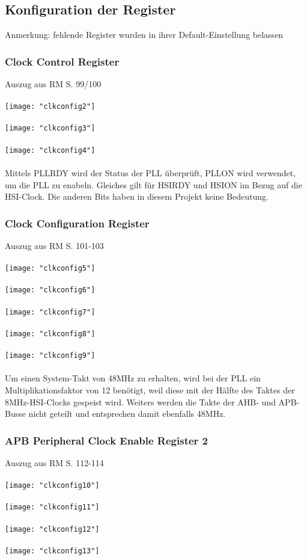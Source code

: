 \documentclass[11pt]{report}
\begin{document}
		\subsection{Konfiguration der Register}
			Anmerkung: fehlende Register wurden in ihrer Default-Einstellung belassen
			\subsubsection{Clock Control Register}
				Auszug aus RM S. 99/100\\
				\\\texttt{[image: "clkconfig2"]}\\
				\\\texttt{[image: "clkconfig3"]}\\
				\\\texttt{[image: "clkconfig4"]}\\
				\\Mittels PLLRDY wird der Status der PLL überprüft, PLLON wird verwendet, um die PLL zu enabeln. Gleiches gilt für HSIRDY und HSION im Bezug auf die HSI-Clock. Die anderen Bits haben in diesem Projekt keine Bedeutung.
			\subsubsection{Clock Configuration Register}
				Auszug aus RM S. 101-103\\
				\\\texttt{[image: "clkconfig5"]}\\
				\\\texttt{[image: "clkconfig6"]}\\
				\\\texttt{[image: "clkconfig7"]}\\
				\\\texttt{[image: "clkconfig8"]}\\
				\\\texttt{[image: "clkconfig9"]}\\
				\\Um einen System-Takt von 48MHz zu erhalten, wird bei der PLL ein Multiplikationsfaktor von 12 benötigt, weil diese mit der Hälfte des Taktes der 8MHz-HSI-Clocks gespeist wird. Weiters werden die Takte der AHB- und APB-Busse nicht geteilt und entsprechen damit ebenfalls 48MHz.
			\subsubsection{APB Peripheral Clock Enable Register 2}
				Auszug aus RM S. 112-114\\
				\\\texttt{[image: "clkconfig10"]}\\
				\\\texttt{[image: "clkconfig11"]}\\
				\\\texttt{[image: "clkconfig12"]}\\
				\\\texttt{[image: "clkconfig13"]}\\
\end{document}
